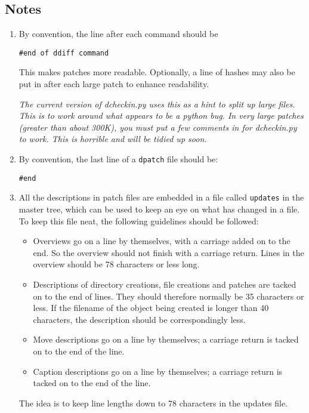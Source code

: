 \documentclass{article}
\begin{document}
\subsection{Notes}

\begin{enumerate}
\item
By convention, the line after each command should be 
\begin{verbatim}
#end of ddiff command
\end{verbatim}

This makes patches more readable. Optionally, a line of hashes may
also be put in after each large patch to enhance readability.

\emph{The current version of dcheckin.py uses this as a hint to split
up large files. This is to work around what appears to be a python
bug. In very large patches (greater than about 300K), you must put a
few comments in for dcheckin.py to work. This is horrible and will be
tidied up soon. }

\item
By convention, the last line of a \texttt{dpatch} file should be:
\begin{verbatim}
#end
\end{verbatim}

\item
All the descriptions in patch files are embedded in a file called
\texttt{updates} in the master tree, which can be used to keep an eye
on what has changed in a file. To keep this file neat, the following
guidelines should be followed:

\begin{itemize}
\item Overviews go on a line by themselves, with a carriage added on
to the end. So the overview should not finish with a carriage
return. Lines in the overview should be 78 characters or less long.

\item Descriptions of directory creations, file creations and patches
are tacked on to the end of lines. They should therefore normally be
35 characters or less. If the filename of the object being created is
longer than 40 characters, the description should be correspondingly less.

\item Move descriptions go on a line by themselves; a carriage return
is tacked on to the end of the line.

\item Caption descriptions go on a line by themselves; a carriage
return
is tacked on to the end of the line.

\end{itemize}
The idea is to keep line lengths down to 78 characters in the updates file.

\end{enumerate}
\end{document}
